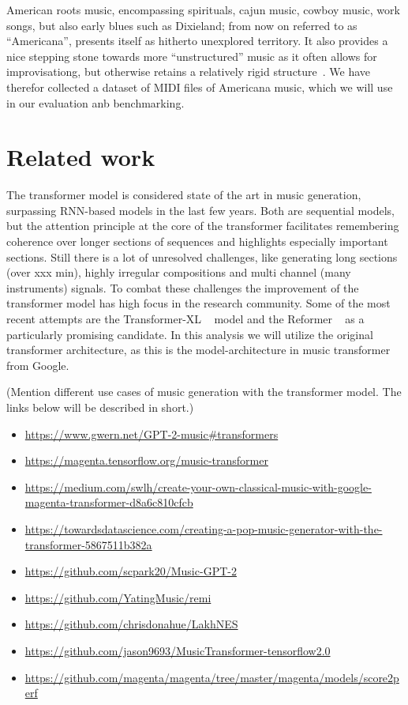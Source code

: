 \documentclass{article}
\begin{document}
        American roots music, encompassing spirituals, cajun music, cowboy music, work songs,
        but also early blues such as Dixieland; from now on referred to as ``Americana'', presents 
        itself as hitherto unexplored territory. It also provides a nice stepping stone
        towards more ``unstructured'' music as it often allows for improvisationg, but 
        otherwise retains a relatively rigid structure~\cite{libcong}.
        We have therefor collected a dataset of MIDI files of Americana music, which we
        will use in our evaluation anb benchmarking.

    \section{Related work}
       The transformer model is considered state of the art in music generation,
       surpassing RNN-based models in the last few years. Both are sequential models,
       but the attention principle at the core of the transformer facilitates
       remembering coherence over longer sections of sequences and highlights
       especially important sections. Still there is a lot of unresolved challenges,
       like generating long sections (over xxx min), highly irregular compositions
       and multi channel (many instruments) signals. To combat these challenges the
       improvement of the transformer model has high focus in the research community.
       Some of the most recent attempts are the Transformer-XL ~\cite{dai2019transformerxl} 
       model and the Reformer ~\cite{kitaev2020reformer} as a particularly promising candidate. In          this analysis we will utilize the original transformer architecture, as this is the
       model-architecture in music transformer from Google.
        
        (Mention different use cases of music generation with the transformer model.
        The links below will be described in short.)
        
        \begin{itemize}
            \item \url{https://www.gwern.net/GPT-2-music#transformers}
            \item \url{https://magenta.tensorflow.org/music-transformer}
            \item \url{https://medium.com/swlh/create-your-own-classical-music-with-google-magenta-transformer-d8a6c810cfcb}
            \item \url{https://towardsdatascience.com/creating-a-pop-music-generator-with-the-transformer-5867511b382a}
            \item \url{https://github.com/scpark20/Music-GPT-2}
            \item \url{https://github.com/YatingMusic/remi}
            \item \url{https://github.com/chrisdonahue/LakhNES}
            \item \url{https://github.com/jason9693/MusicTransformer-tensorflow2.0}
            \item \url{https://github.com/magenta/magenta/tree/master/magenta/models/score2perf}
        \end{itemize}
\end{document}
